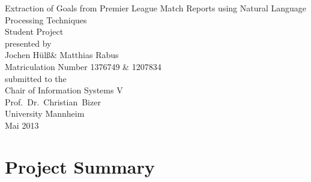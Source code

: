 \documentclass[11pt,titlepage,oneside,openany]{book}
\begin{document}
\lstset{language=HTML} 
\begin{titlepage}
	\vspace*{2cm}
  \begin{center}
   {\Large Extraction of Goals from Premier League Match Reports using Natural Language Processing Techniques\\}
   \vspace{2cm} 
   {Student  Project\\}
   \vspace{2cm}
   {presented by\\
    Jochen H\"{u}l\ss \xspace  \&  Matthias Rabus \\
    Matriculation Number 1376749 \& 1207834 \\
   }
   \vspace{1cm} 
   {submitted to the\\
    Chair of Information Systems V\\
    Prof.\ Dr.\ Christian\ Bizer\\
    University Mannheim\\} \vspace{2cm}
   {Mai 2013}
  \end{center}
\end{titlepage} 

\tableofcontents
\newpage


\listoffigures


\newpage



\chapter{Project Summary}
\end{document}

